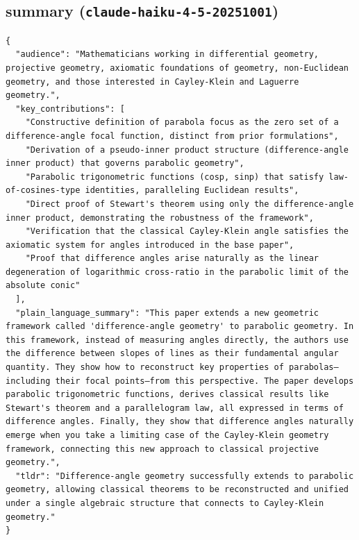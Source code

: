 \documentclass[11pt]{article}
\begin{document}
\subsection*{summary (\texttt{claude-haiku-4-5-20251001})}
\begin{verbatim}
{
  "audience": "Mathematicians working in differential geometry, projective geometry, axiomatic foundations of geometry, non-Euclidean geometry, and those interested in Cayley-Klein and Laguerre geometry.",
  "key_contributions": [
    "Constructive definition of parabola focus as the zero set of a difference-angle focal function, distinct from prior formulations",
    "Derivation of a pseudo-inner product structure (difference-angle inner product) that governs parabolic geometry",
    "Parabolic trigonometric functions (cosp, sinp) that satisfy law-of-cosines-type identities, paralleling Euclidean results",
    "Direct proof of Stewart's theorem using only the difference-angle inner product, demonstrating the robustness of the framework",
    "Verification that the classical Cayley-Klein angle satisfies the axiomatic system for angles introduced in the base paper",
    "Proof that difference angles arise naturally as the linear degeneration of logarithmic cross-ratio in the parabolic limit of the absolute conic"
  ],
  "plain_language_summary": "This paper extends a new geometric framework called 'difference-angle geometry' to parabolic geometry. In this framework, instead of measuring angles directly, the authors use the difference between slopes of lines as their fundamental angular quantity. They show how to reconstruct key properties of parabolas—including their focal points—from this perspective. The paper develops parabolic trigonometric functions, derives classical results like Stewart's theorem and a parallelogram law, all expressed in terms of difference angles. Finally, they show that difference angles naturally emerge when you take a limiting case of the Cayley-Klein geometry framework, connecting this new approach to classical projective geometry.",
  "tldr": "Difference-angle geometry successfully extends to parabolic geometry, allowing classical theorems to be reconstructed and unified under a single algebraic structure that connects to Cayley-Klein geometry."
}
\end{verbatim}
\end{document}
